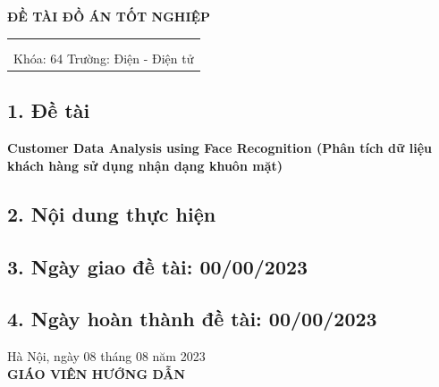\centerline{\textbf{\large ĐỀ TÀI ĐỒ ÁN TỐT NGHIỆP}}

\begin{table}[H]
    \centering
    \begin{tabular}{l r}
    \fontsize{14pt}{0pt}\selectfont {Họ và tên sinh viên 1: Nguyễn Văn A}    & \fontsize{14pt}{0pt}\selectfont {MSSV: 2019xxxx}\\
    \fontsize{14pt}{0pt}\selectfont {Họ và tên sinh viên 2: Nguyễn Thị B}    & \fontsize{14pt}{0pt}\selectfont {MSSV: 2019xxxx}\\
    \multicolumn{2}{c}{Khóa: 64 \hspace{2.5cm} Trường: Điện - Điện tử}
\end{tabular}
\end{table}
\subsection*{\textnormal{1. Đề tài}}
\textbf{Customer Data Analysis using Face Recognition (Phân tích dữ liệu khách hàng sử dụng nhận dạng khuôn mặt)}

\subsection*{\textnormal{2. Nội dung thực hiện}}

\subsection*{\textnormal{3. Ngày giao đề tài: 00/00/2023}}

\subsection*{\textnormal{4. Ngày hoàn thành đề tài: 00/00/2023}}

\begin{flushright}
Hà Nội, ngày 08 tháng 08 năm 2023\\
\textbf{GIÁO VIÊN HƯỚNG DẪN}
\end{flushright}
\newpage
